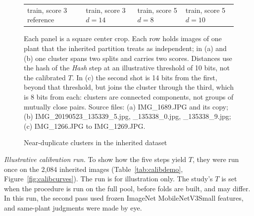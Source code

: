 \documentclass{icsthesis}
\begin{document}
\begin{mainmatter}
\begin{figure}[!ht]
\begin{tabular}{p{}p{}p{}p{}}
				\centering train, score 3 \newline reference & \centering train, score 3 \newline $d=14$ & \centering train, score 5 \newline $d=8$ & \centering train, score 5 \newline $d=10$ \\
				\end{tabular}\par
				\caption{Near-duplicate clusters in the inherited dataset}
				\label{fig:neardup}

				\vspace{1ex}
				\begin{minipage}{0.9\textwidth}
				\singlespacing\footnotesize
				Each panel is a square center crop. Each row holds images of one plant that the
				inherited partition treats as independent; in (a) and (b) one cluster spans two splits
				and carries two scores. Distances use the hash of the \textit{Hash} step at an
				illustrative threshold of 10 bits, not the calibrated $T$. In (c) the second shot is
				14 bits from the first, beyond that threshold, but joins the cluster through the third,
				which is 8 bits from each: clusters are connected components, not groups of
				mutually close pairs. Source files: (a) IMG\_1689.JPG and its copy; (b)
				IMG\_20190523\_135339\_5.jpg, \_135338\_0.jpg, \_135338\_9.jpg; (c)
				IMG\_1266.JPG to IMG\_1269.JPG.
				\end{minipage}
				\end{figure}
				\clearpage
				\textit{Illustrative calibration run.} To show how the five steps yield $T$,
				they were run once on the 2,084 inherited images
				(Table~\ref{tab:calibdemo}, Figure~\ref{fig:calibcurves}). The run is for
				illustration only. The study's $T$ is set when the procedure is run on the full
				pool, before folds are built, and may differ. In this run, the second pass used
				frozen ImageNet MobileNetV3Small features, and same-plant judgments were made by
				eye.


\end{mainmatter}
\end{document}
